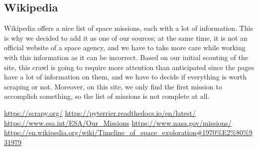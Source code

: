 \documentclass{article}
\begin{document}
\subsection{Wikipedia\textsuperscript{\cite{wikipedia}}}\label{subsec:wikipedia}
Wikipedia offers a nice list of space missions, each with a lot of information. This is why we decided to add it as one of our sources; at the same time, it is not an official website of a space agency, and we have to take more care while working with this information as it can be incorrect. Based on our initial scouting of the site, this crawl is going to require more attention than anticipated since the pages have a lot of information on them, and we have to decide if everything is worth scraping or not. Moreover, on this site, we only find the first mission to accomplish something, so the list of missions is not complete at all.

\newpage

\begin{thebibliography}{9}
     \url {https://scrapy.org/}
     \url {https://pyterrier.readthedocs.io/en/latest/}
     \url{https://www.esa.int/ESA/Our_Missions}
     \url{https://www.nasa.gov/missions/}
     \url{https://en.wikipedia.org/wiki/Timeline_of_space_exploration#1970%E2%80%931979}
\end{thebibliography}
\end{document}
